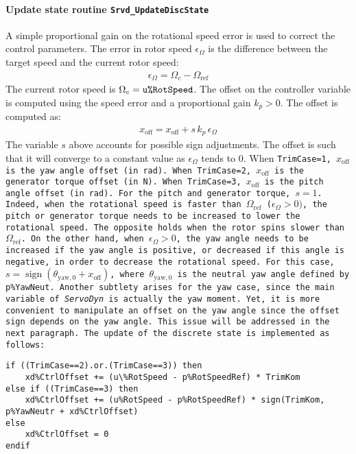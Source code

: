 \documentclass[11pt]{article}
\begin{document}
\paragraph{Update state routine \tt{Srvd\_UpdateDiscState}}
A simple proportional gain on the rotational speed error is used to correct the control parameters.
The error in rotor speed $\epsilon_\Omega$ is the difference between the target speed and the current rotor speed:
        \begin{align}
            \epsilon_\Omega ={\Omega_c - \Omega_\text{ref}}
        \end{align}
The current rotor speed is $\Omega_c=\tt{u\%RotSpeed}$.
        The offset on the controller variable is computed using 
        the speed error and a proportional gain $k_p>0$. The offset is computed as:
        \begin{align}
            x_\text{off} = x_\text{off} + s\, k_p\, \epsilon_\Omega \label{eq:xoffpitch}
        \end{align}
The variable $s$ above accounts for possible sign adjustments. 
The offset is such that it will converge to a constant value as $\epsilon_\Omega$ tends to 0.
When \tt{TrimCase}=1, $x_\text{off}$ is the yaw angle offset (in rad). 
When \tt{TrimCase}=2, $x_\text{off}$ is the generator torque offset (in N). 
When \tt{TrimCase}=3, $x_\text{off}$ is the pitch angle offset (in rad). 
For the pitch and generator torque, $s=1$. Indeed, when the rotational speed is faster than $\Omega_\text{ref}$ ($\epsilon_\Omega>0)$, the  pitch or generator torque needs to be increased to lower the rotational speed. The opposite holds when the rotor spins slower than $\Omega_\text{ref}$.
On the other hand, when $\epsilon_\Omega>0$, the yaw angle needs to be increased if the yaw angle is positive, or decreased if this angle is negative, in order to decrease the rotational speed. For this case, $s=\operatorname{sign}( \theta_{\text{yaw},0}+x_\text{off})$, where $\theta_{\text{yaw},0}$ is the neutral yaw angle defined by \tt{p\%YawNeut}.
Another subtlety arises for the yaw case, since the main variable of \textit{ServoDyn} is actually the yaw moment. Yet, it is more convenient to manipulate an offset on the yaw angle since the offset sign depends on the yaw angle. 
This issue will be addressed in the next paragraph.
The update of the discrete state is implemented as follows:
\begin{lstlisting}
if ((TrimCase==2).or.(TrimCase==3)) then
    xd%CtrlOffset += (u\%RotSpeed - p%RotSpeedRef) * TrimKom 
else if ((TrimCase==3) then
    xd%CtrlOffset += (u%RotSpeed - p%RotSpeedRef) * sign(TrimKom, p%YawNeutr + xd%CtrlOffset)
else
    xd%CtrlOffset = 0
endif
\end{lstlisting}
\end{document}
